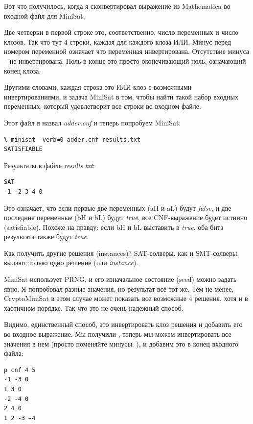 Вот что получилось, когда я сконвертировал выражение из Mathematica во входной файл для MiniSat:



Две четверки в первой строке это, соответственно, число переменных и число клозов.
Так что тут 4 строки, каждая для каждого клоза ИЛИ.
Минус перед номером переменной означает что переменная инвертирована.
Отсутствие минуса -- не инвертирована.
Ноль в конце это просто оконечивающий ноль, означающий конец клоза.

Другими словами, каждая строка это ИЛИ-клоз с возможными инвертированиями,
и задача MiniSat в том, чтобы найти такой набор входных переменных, который удовлетворит все строки во входном файле.

Этот файл я назвал \textit{adder.cnf} и теперь попробуем MiniSat:

\begin{lstlisting}
% minisat -verb=0 adder.cnf results.txt
SATISFIABLE
\end{lstlisting}

Результаты в файле \textit{results.txt}:

\begin{lstlisting}
SAT
-1 -2 3 4 0
\end{lstlisting}

Это означает, что если первые две переменных (aH и aL) будут \textit{false},
и две последние переменные (bH и bL) будут \textit{true},
все \ac{CNF}-выражение будет истинно (satisfiable).
Похоже на правду: если bH и bL выставить в \textit{true}, оба бита результата также будут \textit{true}.

Как получить другие решения (instances)?
\ac{SAT}-солверы, как и \ac{SMT}-солверы, выдают только одно решение (или \textit{instance}).

MiniSat использует \ac{PRNG}, и его изначальное состояние (seed) можно задать явно.
Я попробовал разные значения, но результат всё тот же.
Тем не менее, CryptoMiniSat в этом случае может показать все возможные 4 решения, хотя и в хаотичном порядке.
Так что это не очень надежный способ.

Видимо, единственный способ, это инвертировать клоз решения и добавить его во входное выражение.
Мы получили , 
теперь мы можем инвертировать все значения в нем (просто поменяйте минусы: ),
и добавим это в конец входного файла:

\begin{lstlisting}
p cnf 4 5
-1 -3 0
1 3 0
-2 -4 0
2 4 0
1 2 -3 -4
\end{lstlisting}

